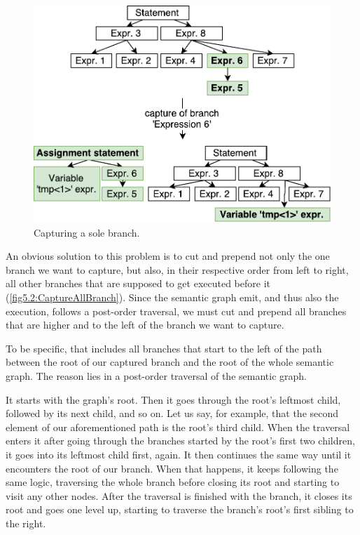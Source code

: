 \begin{figure}[h]
	\centering	
	\includegraphics[scale=0.75]{../img/5_2_capturing}	
	\caption{Capturing a sole branch.}
	\label{fig5.2:CaptureBranch}
\end{figure}

An obvious solution to this problem is to cut and prepend not only the one branch we want to capture, but also, in their respective order from left to right, all other branches that are supposed to get executed before it (\autoref{fig5.2:CaptureAllBranch}). Since the semantic graph emit, and thus also the execution, follows a post-order traversal, we must cut and prepend all branches that are higher and to the left of the branch we want to capture. 

To be specific, that includes all branches that start to the left of the path between the root of our captured branch and the root of the whole semantic graph. The reason lies in a post-order traversal of the semantic graph. 

It starts with the graph’s root. Then it goes through the root’s leftmost child, followed by its next child, and so on. Let us say, for example, that the second element of our aforementioned path is the root’s third child. When the traversal enters it after going through the branches started by the root’s first two children, it goes into its leftmost child first, again. It then continues the same way until it encounters the root of our branch. When that happens, it keeps following the same logic, traversing the whole branch before closing its root and starting to visit any other nodes. After the traversal is finished with the branch, it closes its root and goes one level up, starting to traverse the branch’s root’s first sibling to the right.   

